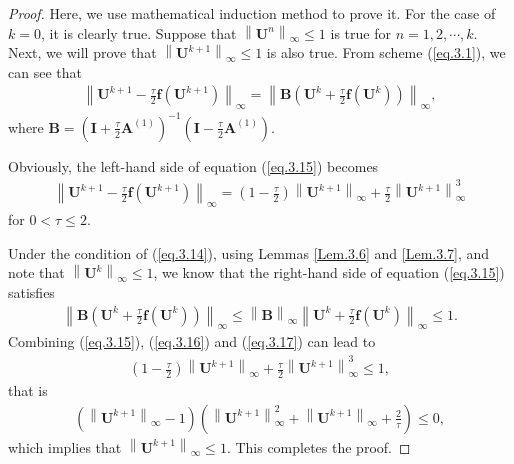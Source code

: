 \documentclass{siamart171218}
\numberwithin{theorem}{section}
\numberwithin{equation}{section}
\begin{document}
\begin{proof}
Here, we use mathematical induction method to prove it.
For the case of $k=0$, it is clearly true. Suppose that
$\left\|\mathbf{U}^n\right\|_\infty\leq1$ is true for $n=1,2,\cdots,k$. Next,
we will prove that $\left\|\mathbf{U}^{k+1}\right\|_\infty\leq1$ is also true.
From scheme (\ref{eq.3.1}), we can see that
\begin{equation}\label{eq.3.15}
\begin{aligned}\displaystyle
\left\|\mathbf{U}^{k+1}-\frac{\tau}{2}
\mathbf{f}\left(\mathbf{U}^{k+1}\right)\right\|_{\infty}
=\left\|\mathbf{B}\left(\mathbf{U}^{k}+\frac{\tau}{2}
\mathbf{f}\left(\mathbf{U}^{k}\right)\right)\right\|_{\infty},
\end{aligned}
\end{equation}
where $\mathbf{B}=\left(
\mathbf{I}+\frac{\tau}{2}\mathbf{A}^{(1)}
\right)^{-1}\left(
\mathbf{I}-\frac{\tau}{2}\mathbf{A}^{(1)}
\right)$.

Obviously,
 the left-hand side of equation (\ref{eq.3.15}) becomes
\begin{equation}\label{eq.3.16}
\begin{aligned}\displaystyle
\left\|\mathbf{U}^{k+1}-\frac{\tau}{2}
\mathbf{f}\left(\mathbf{U}^{k+1}\right)\right\|_{\infty}
=\left(1-\frac{\tau}{2}\right)\left\|\mathbf{U}^{k+1}\right\|_{\infty}
+\frac{\tau}{2}\left\|\mathbf{U}^{k+1}\right\|_{\infty}^3
\end{aligned}
\end{equation}
for $0<\tau\leq2$.

Under the condition of (\ref{eq.3.14}), using
Lemmas \ref{Lem.3.6} and \ref{Lem.3.7}, and note that $\left\|\mathbf{U}^k\right\|_\infty\leq1$,
we know that the right-hand side
 of equation (\ref{eq.3.15}) satisfies
\begin{equation}\label{eq.3.17}
\begin{aligned}\displaystyle
\left\|\mathbf{B}\left(\mathbf{U}^{k}+\frac{\tau}{2}
\mathbf{f}\left(\mathbf{U}^{k}\right)\right)\right\|_{\infty}
\leq\left\|\mathbf{B}\right\|_{\infty}
\left\|\mathbf{U}^{k}+\frac{\tau}{2}
\mathbf{f}\left(\mathbf{U}^{k}\right)\right\|_{\infty}
\leq1.
\end{aligned}
\end{equation}
Combining (\ref{eq.3.15}), (\ref{eq.3.16}) and (\ref{eq.3.17}) can lead to
\begin{equation*}
\begin{aligned}\displaystyle
\left(1-\frac{\tau}{2}\right)\left\|\mathbf{U}^{k+1}\right\|_{\infty}
+\frac{\tau}{2}\left\|\mathbf{U}^{k+1}\right\|_{\infty}^3\leq1,
\end{aligned}
\end{equation*}
that is
\begin{equation*}
\begin{aligned}\displaystyle
\left(\left\|\mathbf{U}^{k+1}\right\|_{\infty}-1\right)
\left(\left\|\mathbf{U}^{k+1}\right\|_{\infty}^2+
\left\|\mathbf{U}^{k+1}\right\|_{\infty}+\frac{2}{\tau}\right)\leq0,
\end{aligned}
\end{equation*}
which implies that $\left\|\mathbf{U}^{k+1}\right\|_{\infty}\leq1$.
 This completes the proof.
\end{proof}
\end{document}
